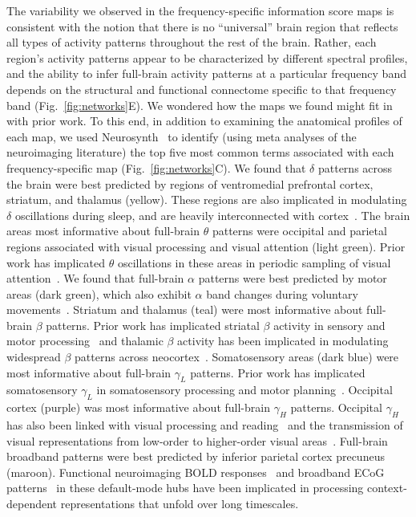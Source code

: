 \documentclass[11pt]{article}
\begin{document}
The variability we observed in the frequency-specific information score maps is
consistent with the notion that there is no ``universal'' brain region that
reflects all types of activity patterns throughout the rest of the brain.
Rather, each region's activity patterns appear to be characterized by different
spectral profiles, and the ability to infer full-brain activity patterns at a
particular frequency band depends on the structural and functional connectome
specific to that frequency band (Fig.~\ref{fig:networks}E).  We wondered how the
maps we found might fit in with prior work.  To this end, in addition to
examining the anatomical profiles of each map, we used
Neurosynth~\citep{RubiEtal17} to identify (using meta analyses of the
neuroimaging literature) the top five most common terms associated with each
frequency-specific map (Fig.~\ref{fig:networks}C).  We found that $\delta$
patterns across the brain were best predicted by regions of ventromedial
prefrontal cortex, striatum, and thalamus (yellow).  These regions are also
implicated in modulating $\delta$ oscillations during sleep, and are heavily
interconnected with cortex~\citep[e.g.,][]{AmziSter98}.  The brain areas most
informative about full-brain $\theta$ patterns were occipital and parietal regions
associated with visual processing and visual attention (light green). Prior work
has implicated $\theta$ oscillations in these areas in periodic sampling of
visual attention~\citep[e.g.,][]{BuscVanR10}.  We found that full-brain $\alpha$
patterns were best predicted by motor areas (dark green), which also exhibit
$\alpha$ band changes during voluntary movements~\citep[e.g.,][]{JurkEtal06}.
Striatum and thalamus (teal) were most informative about full-brain $\beta$
patterns.  Prior work has implicated striatal $\beta$ activity in sensory and
motor processing~\citep{FeinEtal15} and thalamic $\beta$ activity has been
implicated in modulating widespread $\beta$ patterns across
neocortex~\citep{SherEtal16}. Somatosensory areas (dark blue) were most
informative about full-brain $\gamma_L$ patterns. Prior work has implicated
somatosensory $\gamma_L$ in somatosensory processing and motor
planning~\citep{IharEtal03}.  Occipital cortex (purple) was most informative
about full-brain $\gamma_H$ patterns.  Occipital $\gamma_H$ has also been linked
with visual processing and reading~\citep{WuEtal11} and the transmission of
visual representations from low-order to higher-order visual
areas~\citep{MatsEtal13}.  Full-brain broadband patterns were best predicted by
inferior parietal cortex precuneus (maroon).  Functional neuroimaging BOLD
responses~\citep{SimoEtal16} and broadband ECoG patterns~\citep{HoneEtal12a} in
these default-mode hubs have been implicated in processing context-dependent
representations that unfold over long timescales.
\end{document}
